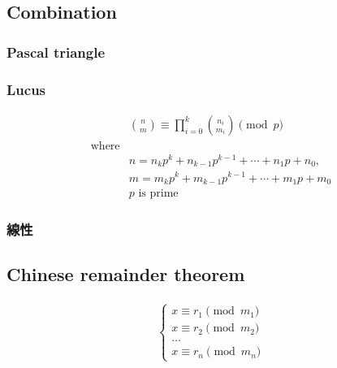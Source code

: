 \documentclass[10pt,oneside]{article}
\begin{document}
\begin{landscape}
\begin{multicols}{2}
\subsection{Combination}

\subsubsection{Pascal triangle}


\subsubsection{Lucus}

\begin{equation}
\begin{split}&\binom{n}{m} \equiv \prod_{i=0}^k \binom{n_i}{m_i} \pmod p \\
\text{where}& \\
&n = n_kp^k+n_{k-1}p^{k-1}+\cdots +n_1p+n_0, \\
&m = m_kp^k+m_{k-1}p^{k-1}+\cdots +m_1p+m_0 \\
&p \text{ is prime}
\end{split}
\end{equation}


\subsubsection{線性}


\subsection{Chinese remainder theorem}

\begin{equation}
\begin{split}
\begin{cases}
        x \equiv r_1 \pmod {m_1} \\
        x \equiv r_2 \pmod {m_2} \\
        \dots \\
        x \equiv r_n \pmod {m_n}
\end{cases}
\end{split}
\end{equation}


\end{multicols}
\end{landscape}
\end{document}
